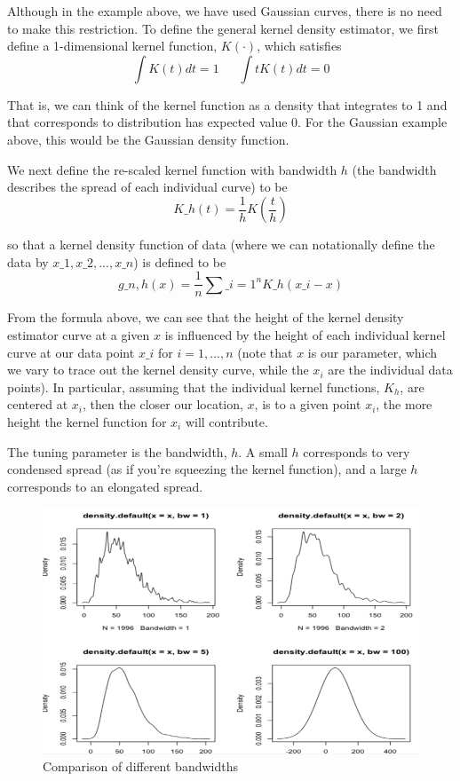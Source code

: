 Although in the example above, we have used Gaussian curves, there is no need to make this restriction. To define the general kernel density estimator, we first define a 1-dimensional kernel function, $K(\cdot)$, which satisfies
$$\int K(t) dt = 1 ~~~~~~~ \int t K(t) dt = 0$$

That is, we can think of the kernel function as a density that integrates to 1 and that corresponds to distribution has expected value 0. For the Gaussian example above, this would be the Gaussian density function.

We next define the re-scaled kernel function with bandwidth $h$ (the bandwidth describes the spread of each individual curve) to be
$$K\_h(t) = \frac{1}{h} K\left( \frac{t}{h} \right)$$

so that a kernel density function of data (where we can notationally define the data by $x\_1, x\_2, ..., x\_n$) is defined to be 
$$g\_{n, h}(x) = \frac{1}{n} \sum\_{i=1}^n K\_h(x\_i - x)$$


From the formula above, we can see that the height of the kernel density estimator curve at a given $x$ is influenced by the height of each individual kernel curve at our data point $x\_i$ for $i = 1, ..., n$ (note that $x$ is our parameter, which we vary to trace out the kernel density curve, while the $x_i$ are the individual data points). In particular, assuming that the individual kernel functions, $K_h$, are centered at $x_i$, then the closer our location, $x$, is to a given point $x_i$, the more height the kernel function for $x_i$ will contribute.

The tuning parameter is the bandwidth, $h$. A small $h$ corresponds to very condensed spread (as if you're squeezing the kernel function), and a large $h$ corresponds to an elongated spread. 



\begin{figure}[H]
\begin{center}
\includegraphics[scale=0.5]{bandwidth.png}
\end{center}
\caption{Comparison of different bandwidths}
\label{fig:bandwidth}
\end{figure}

